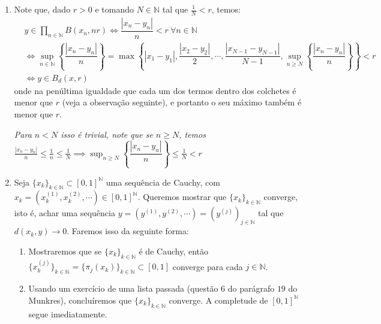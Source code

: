 \begin{dem}

\begin{enumerate}[label=\color{blue}\normalfont\textbf{(\alph*)}]
\item Note que, dado $r > 0$ e tomando $N \in \mathbb{N}$ tal que $\frac{1}{N} <r $, temos:
        \begin{align}
            &y \in \displaystyle{\prod_{n \in \mathbb{N}} B(x_n, nr)} \iff \dfrac{|x_n - y_n|}{n} < r \ \forall n \in \mathbb{N}\\
            &\iff \displaystyle{\sup_{n \in \mathbb{N}}\left\{\dfrac{|x_n - y_n|}{n} \right\} = \max \left\{|x_1 - y_1|, \dfrac{|x_2 - y_2|}{2}, \cdots, \dfrac{|x_{N-1} - y_{N-1}|}{N-1},\sup_{n \geq N }\left\{\dfrac{|x_n - y_n|}{n} \right\} \right\} } < r \\
            &\iff y \in B_d(x, r)
        \end{align}
        onde na penúltima igualdade que cada um dos termos dentro dos colchetes é menor que $r$ (veja a observação seguinte), e portanto o seu máximo também é menor que $r$. \par
        \begin{oobs}
        \textit{Para $n < N$ isso é trivial, note que se $n \geq N$, temos $\frac{|x_n - y_n|}{n} \leq \frac{1}{n} \leq \frac{1}{N} \implies \displaystyle{\sup_{n \geq N }\left\{\dfrac{|x_n - y_n|}{n} \right\} \leq \frac{1}{N} < r}$}
        \end{oobs}
\item Seja $\{x_k \}_{k \in \mathbb{N}} \subset [0,1]^{\mathbb{N}}$ uma sequência de Cauchy, com $x_k = (x_k^{(1)},x_k^{(2)}, \cdots) \in [0,1]^{\mathbb{N}}$. Queremos mostrar que $\{x_k \}_{k \in \mathbb{N}}$ converge, isto é, achar uma sequência $y = (y^{(1)}, y^{(2)}, \cdots) = (y^{(j)})_{j \in \mathbb{N}}$ tal que $d(x_k, y) \to 0$. Faremos isso da seguinte forma:
        \begin{enumerate}[label=\color{blue}{\textbf{(\roman*)}}]
            \item\label{passoI} Mostraremos que se $\{x_k \}_{k \in \mathbb{N}}$ é de Cauchy, então $\{x_k^{(j)} \}_{k \in \mathbb{N}} = \{\pi_j(x_k) \}_{k \in \mathbb{N}} \subset [0,1]$ converge para cada $j \in \mathbb{N}$.
            \item Usando um exercício de uma lista passada (questão $6$ do parágrafo $19$ do Munkres), concluíremos que $\{x_k \}_{k \in \mathbb{N}}$ converge. A completude de $[0,1]^\mathbb{N}$ segue imediatamente.
        \end{enumerate}

\end{enumerate}
\end{dem}
